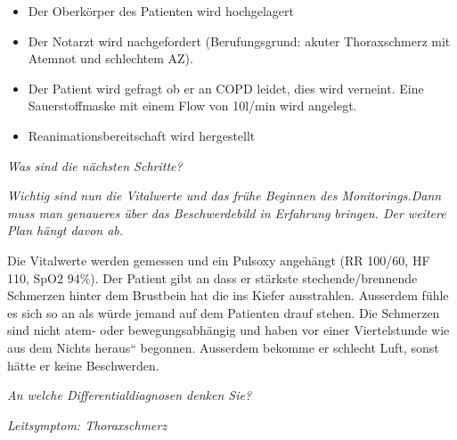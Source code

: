 \documentclass{article}
\newcommand\gH[1]{\textmd{\textcolor[rgb]{0.0,0.0,0.5019608}{#1}}}
\begin{document}
\begin{itemize}
\item {\mdseries\color[rgb]{0.0,0.0,0.5019608}
Der Oberk\"orper des Patienten wird hochgelagert }

\item {\mdseries\color[rgb]{0.0,0.0,0.5019608}
Der Notarzt wird nachgefordert (Berufungsgrund: akuter Thoraxschmerz mit
Atemnot und schlechtem AZ).}

\item {\mdseries\color[rgb]{0.0,0.0,0.5019608}
Der Patient wird gefragt ob er an COPD leidet, dies wird verneint. Eine
Sauerstoffmaske mit einem Flow von 10l/min wird angelegt. }

\item {\mdseries\color[rgb]{0.0,0.0,0.5019608}
Reanimationsbereitschaft wird hergestellt}

\end{itemize}
{\mdseries\itshape
Was sind die n\"achsten Schritte?}

{\mdseries\itshape
\gH{Wichtig sind nun die Vitalwerte und das fr\"uhe
Beginnen des Monitorings.Dann muss man genaueres \"uber das
Beschwerdebild in Erfahrung bringen. Der weitere Plan h\"angt davon
ab.}}

{\mdseries
Die Vitalwerte werden gemessen und ein Pulsoxy angeh\"angt (RR 100/60,
HF 110, SpO2 94\%). Der Patient gibt an dass er st\"arkste
stechende/brennende Schmerzen hinter dem Brustbein hat die ins Kiefer
ausstrahlen. Ausserdem f\"uhle es sich so an als w\"urde jemand auf dem
Patienten drauf stehen. Die Schmerzen sind nicht atem- oder
bewegungsabh\"angig  und haben vor einer Viertelstunde
{\quotedblbase}wie aus dem Nichts heraus{\textquotedblleft} begonnen.
Ausserdem bekomme er schlecht Luft, sonst h\"atte er keine Beschwerden.
}

{\mdseries\itshape
An welche Differentialdiagnosen denken Sie?}

{\mdseries\itshape
\gH{Leitsymptom: Thoraxschmerz }}
\end{document}
